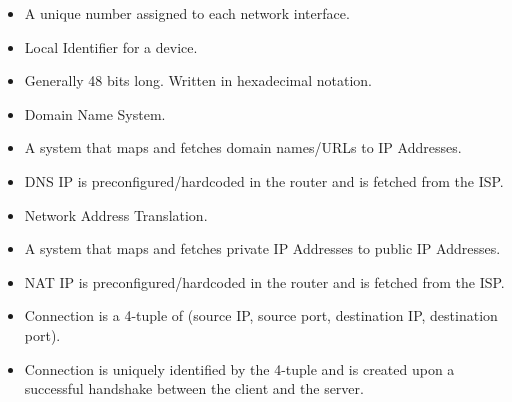 \documentclass[a4paper, twoside]{report}
\begin{document}
\begin{itemize}
    \item A unique number assigned to each network interface.
    \item Local Identifier for a device.
    \item Generally 48 bits long. Written in hexadecimal notation.
\end{itemize}

\begin{itemize}
    \item Domain Name System.
    \item A system that maps and fetches domain names/URLs to IP Addresses.
    \item DNS IP is preconfigured/hardcoded in the router and is fetched from the ISP\@.
\end{itemize}

\begin{itemize}
    \item Network Address Translation.
    \item A system that maps and fetches private IP Addresses to public IP Addresses.
    \item NAT IP is preconfigured/hardcoded in the router and is fetched from the ISP\@.
\end{itemize}

\begin{itemize}
    \item Connection is a 4-tuple of (source IP, source port, destination IP, destination port).
    \item Connection is uniquely identified by the 4-tuple and is created upon a successful handshake between the client and the server.
\end{itemize}

\end{document}
